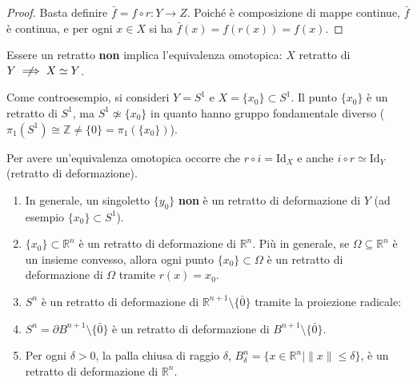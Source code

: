 \begin{proof}
Basta definire $\bar{f} = f \circ r: Y \to Z$. Poiché è composizione di mappe continue, $\bar{f}$ è continua, e per ogni $x \in X$ si ha $\bar{f}(x) = f(r(x)) = f(x)$.
\end{proof}

\begin{observacion}
Essere un retratto \textbf{non} implica l'equivalenza omotopica: $X$ retratto di $Y \centernot\implies X \simeq Y$.

Come controesempio, si consideri $Y = S^1$ e $X = \{x_0\} \subset S^1$. Il punto $\{x_0\}$ è un retratto di $S^1$, ma $S^1 \not\simeq \{x_0\}$ in quanto hanno gruppo fondamentale diverso ($\pi_1(S^1) \cong \mathbb{Z} \neq \{0\} = \pi_1(\{x_0\})$).

Per avere un'equivalenza omotopica occorre che $r \circ i = \mathrm{Id}_X$ e anche $i \circ r \simeq \mathrm{Id}_Y$ (retratto di deformazione).
\end{observacion}

\vspace{1.5em}

\begin{ejemplo}
\begin{enumerate}
    \item In generale, un singoletto $\{y_0\}$ \textbf{non} è un retratto di deformazione di $Y$ (ad esempio $\{x_0\} \subset S^1$).
    \item $\{x_0\} \subset \mathbb{R}^n$ è un retratto di deformazione di $\mathbb{R}^n$. Più in generale, se $\Omega \subseteq \mathbb{R}^n$ è un insieme convesso, allora ogni punto $\{x_0\} \subset \Omega$ è un retratto di deformazione di $\Omega$ tramite $r(x) = x_0$.
    \item $S^n$ è un retratto di deformazione di $\mathbb{R}^{n+1} \setminus \{\bar{0}\}$ tramite la proiezione radicale:
    \item $S^n = \partial B^{n+1} \setminus \{\bar{0}\}$ è un retratto di deformazione di $B^{n+1} \setminus \{\bar{0}\}$.
    \item Per ogni $\delta > 0$, la palla chiusa di raggio $\delta$, $B_\delta^n = \{x \in \mathbb{R}^n \mid \|x\| \leqslant \delta\}$, è un retratto di deformazione di $\mathbb{R}^n$.
\end{enumerate}
\end{ejemplo}

